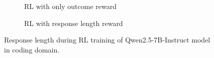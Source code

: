 % 

	\begin{figure}[h!]
		\centering
		\begin{subfigure}[b]{0.45\textwidth}
			\centering
			\caption{RL with only outcome reward}
            \label{fig:qwen_rl_code}
		\end{subfigure}
		\hfill
		\begin{subfigure}[b]{0.45\textwidth}
			\centering
			\caption{RL with response length reward}
            \label{fig:qwen_rl_code_with_len_p}
		\end{subfigure}
		\vspace{0.2em}
     \caption{Response length during RL training of Qwen2.5-7B-Instruct model in coding domain.}
     \label{fig:qwen_result_code}
	\end{figure}